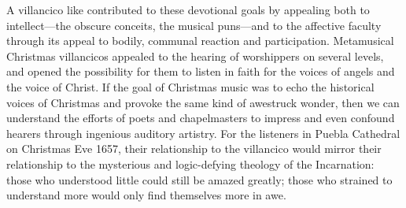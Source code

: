 A villancico like  contributed to these
devotional goals by appealing both to intellect---the obscure conceits, the
musical puns---and to the affective faculty through its appeal to bodily,
communal reaction and participation.
Metamusical Christmas villancicos appealed to the hearing of worshippers on
several levels, and opened the possibility for them to listen in faith for the
voices of angels and the voice of Christ.
If the goal of Christmas music was to echo the historical voices of Christmas
and provoke the same kind of awestruck wonder, then we can understand the
efforts of poets and chapelmasters to impress and even confound hearers through
ingenious auditory artistry.
For the listeners in Puebla Cathedral on Christmas Eve 1657, their relationship
to the villancico  would mirror their
relationship to the mysterious and logic-defying theology of the Incarnation:
those who understood little could still be amazed greatly; those who strained
to understand more would only find themselves more in awe.


\endinput
